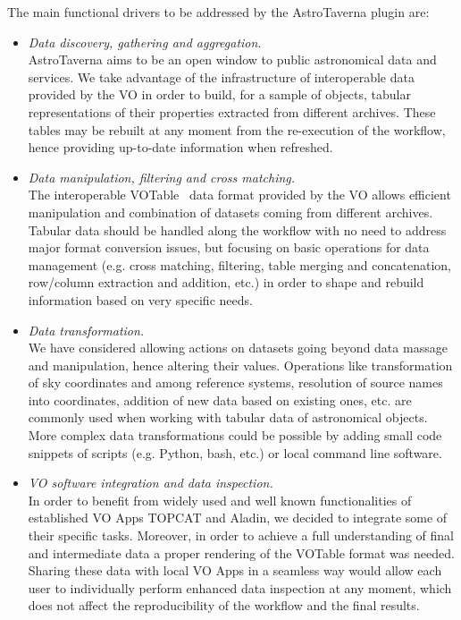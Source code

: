 \documentclass[final,authoryear,5p,times,twocolumn]{elsarticle}
\begin{document}
The main functional drivers to be addressed by the AstroTaverna plugin are:
\begin{itemize}
\item
\textit{Data discovery, gathering and aggregation.}\\
AstroTaverna aims to be an open window to public astronomical data and services. We take advantage of the infrastructure of interoperable data provided by the VO in order to build, for a sample of objects, tabular representations of their properties extracted from different archives. These tables may be rebuilt at any moment from the re-execution of the workflow, hence providing up-to-date information when refreshed.
\item
\textit{Data manipulation, filtering and cross matching.}\\
The interoperable VOTable~\citep{Ochsenbein2009} data format provided by the VO allows efficient manipulation and combination of datasets coming from different archives. Tabular data should be handled along the workflow with no need to address major format conversion issues, but focusing on basic operations for data management (e.g. cross matching, filtering, table merging and concatenation, row/column extraction and addition, etc.) in order to shape and rebuild information based on very specific needs.
\item
\textit{Data transformation.}\\
We have considered allowing actions on datasets going beyond data massage and manipulation, hence altering their values. Operations like transformation of sky coordinates and among reference systems, resolution of source names into coordinates, addition of new data based on existing ones, etc. are commonly used when working with tabular data of astronomical objects. More complex data transformations could be possible by adding small code snippets of scripts (e.g. Python, bash, etc.) or local command line software.
\item
\textit{VO software integration and data inspection.}\\
In order to benefit from widely used and well known functionalities of established VO Apps TOPCAT and Aladin, we decided to integrate some of their specific tasks. Moreover, in order to achieve a full understanding of final and intermediate data a proper rendering of the VOTable format was needed. Sharing these data with local VO Apps in a seamless way would allow each user to individually perform enhanced data inspection at any moment, which does not affect the reproducibility of the workflow and the final results.
\end{itemize}
\end{document}
